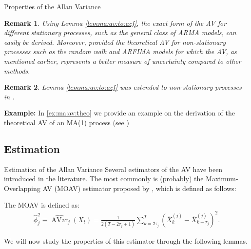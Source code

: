 \documentclass[envcountsect,usenames,dvipsnames]{beamer}
\DeclareMathOperator{\AV}{AVar}
\theoremstyle{mystyle}
\newtheorem{Remark}{Remark}
\begin{document}
\begin{frame}[label = {propAV}]{Properties of the Allan Variance}

\begin{Remark}
Using Lemma \ref{lemma:av:to:acf}, the exact form of the AV for different stationary processes, such as the general class of ARMA models, can easily be derived. Moreover, \cite{zhang2008allan} provided the theoretical AV for non-stationary processes such as the random walk and ARFIMA models for which the AV, as mentioned earlier, represents a better measure of uncertainty compared to other methods.
\end{Remark}

\begin{Remark}
Lemma \ref{lemma:av:to:acf} was extended to non-stationary processes in \cite{xu2017study}.
\end{Remark}

\vspace{0.35cm}
\textbf{Example:} In \ref{ex:ma:av:theo} we provide an example on the derivation of the theoretical AV of an MA(1) process (see \hyperlink{ex:ma:av:theo}{})
\end{frame}


\subsection{Estimation}
\begin{frame}{Estimation of the Allan Variance}
    Several estimators of the AV have been introduced in the literature. The most commonly is (probably) the Maximum-Overlapping AV (MOAV) estimator proposed by \cite{percival1994long}, which is defined as follows:
    
    \begin{Definition}
    \label{def:moav}
    The MOAV is defined as:
    \begin{eqnarray}
\label{eq:MOAVNS_est}
        \hat{\phi}_j^2 \equiv \widehat{\AV}_j \left(X_t \right) = \frac{1}{2 \left(T - 2\tau_j + 1\right)} \sum_{k = 2 \tau_j}^{T} \left(\bar{X}_{k}^{(j)} - \bar{X}_{k-\tau_j}^{(j)} \right)^2.
\end{eqnarray}
    \end{Definition}
    
    We will now study the properties of this estimator through the following lemmas.
\end{frame}
\end{document}
